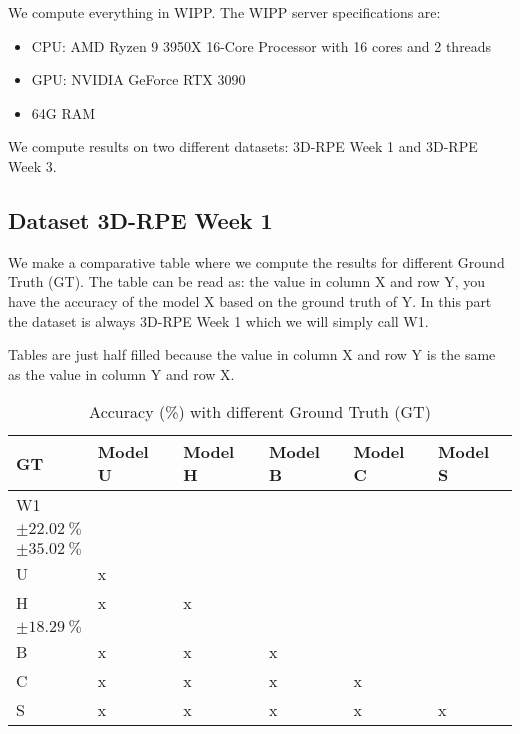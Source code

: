 We compute everything in WIPP. The WIPP server specifications are:
\begin{itemize}
  \item CPU: AMD Ryzen 9 3950X 16-Core Processor with 16 cores and 2 threads
  \item GPU: NVIDIA GeForce RTX 3090
  \item 64G RAM
\end{itemize}

We compute results on two different datasets: 3D-RPE Week 1 and 3D-RPE Week 3.

\subsection{Dataset 3D-RPE Week 1}


We make a comparative table where we compute the results for different Ground
Truth (GT). The table can be read as: the value in column X and row Y, you have
the accuracy of the model X based on the ground truth of Y. In this part the
dataset is always 3D-RPE Week 1 which we will simply call W1.

Tables are just half filled because the value in column X and row Y is the
same as the value in column Y and row X.

\begin{table}[H]
\small
\centering
\caption{\label{tab:base3dRPEdatamask}%
  Accuracy (\%) with different Ground Truth (GT)
}
\begin{tabular}{llllll}
  \toprule
  GT & Model U & Model H & Model B & Model C & Model S \\
  \midrule
  W1 &  & \makecell{$\SI{25.05}{\percent}$ \\ $\pm \SI{22.02}{\percent}$} &  &  & \makecell{$\SI{38.16}{\percent}$ \\ $\pm \SI{35.02}{\percent}$} \\
  U & x &  &  &  &  \\
  H & x & x &  &  & \makecell{$\SI{82.51}{\percent}$ \\ $\pm \SI{18.29}{\percent}$} \\
  B & x & x & x &  &  \\
  C & x & x & x & x &  \\
  S & x & x & x & x & x \\
  \bottomrule
\end{tabular}
\end{table}


